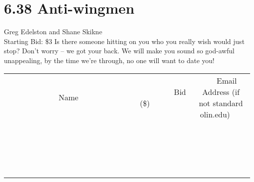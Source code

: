\documentclass[11pt]{article}
\begin{document}
\section*{6.38 Anti-wingmen}
Greg Edelston and Shane Skikne
\\
Starting Bid: \$3
\newline
Is there someone hitting on you who you really wish would just stop? Don't worry -- we got your back. We will make you sound so god-awful unappealing, by the time we're through, no one will want to date you!
\\[3ex]
\begin{tabular}{c c c}
~~~~~~~~~~~~~Name~~~~~~~~~~~~~ & ~~~~~~~~~Bid (\$)~~~~~~~~~  & ~~~Email Address (if not standard olin.edu)~~~\\
 & & \\
\hline
 & & \\
\hline
 & & \\
\hline
 & & \\
\hline
 & & \\
\hline
 & & \\
\hline
 & & \\
\hline
 & & \\
\hline
 & & \\
\hline
 & & \\
\hline
 & & \\
\hline
 & & \\
\hline
 & & \\
\hline
 & & \\
\hline
 & & \\
\hline
 & & \\
\hline
 & & \\
\hline
 & & \\
\hline
 & & \\
\hline
\end{tabular}
\newpage
\end{document}
